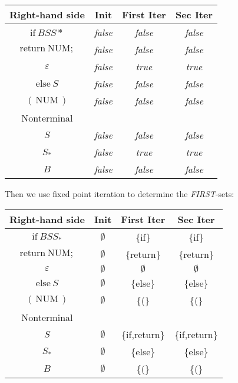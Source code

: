 \documentclass[11pt,a4paper]{article}
\begin{document}
\begin{center}
\begin{tabular}{c||c|c|c}
Right-hand side & Init & First Iter & Sec Iter\tabularnewline
\hline 
\hline 
$\mathrm{if\:}BSS*$ & \emph{false} & \emph{false} & \emph{false}\tabularnewline
\hline 
$\mathrm{return\:NUM;}$ & \emph{false} & \emph{false} & \emph{false}\tabularnewline
\hline 
$\varepsilon$ & \emph{false} & \emph{true} & \emph{true}\tabularnewline
\hline 
$\mathrm{else}\:S$ & \emph{false} & \emph{false} & \emph{false}\tabularnewline
\hline 
$\mathrm{(\,NUM\,)}$ & \emph{false} & \emph{false} & \emph{false}\tabularnewline
\hline 
Nonterminal & \multicolumn{1}{c}{} & \multicolumn{1}{c}{} & \tabularnewline
\hline 
$S$ & \emph{false} & \emph{false} & \emph{false}\tabularnewline
\hline 
$S_*$ & \emph{false} & \emph{true} & \emph{true}\tabularnewline
\hline 
$B$ & \emph{false} & \emph{false} & \emph{false}\tabularnewline
\end{tabular}
\end{center}
Then we use fixed point iteration to determine the \emph{FIRST}-sets:
\begin{center}
\begin{tabular}{c||c|c|c}
Right-hand side & Init & First Iter & Sec Iter\tabularnewline
\hline 
\hline 
$\mathrm{if\:}BSS_*$       & $\emptyset$ & \{if\}        & \{if\}        \tabularnewline
\hline                                                                
$\mathrm{return\:NUM;}$ & $\emptyset$ & \{return\}    & \{return\}    \tabularnewline
\hline                                                                
$\varepsilon$           & $\emptyset$ & $\emptyset$   & $\emptyset$   \tabularnewline
\hline                                                                
$\mathrm{else}\:S$      & $\emptyset$ & \{else\}      & \{else\}      \tabularnewline
\hline                                                                
$\mathrm{(\,NUM\,)}$    & $\emptyset$ & \{(\}         & \{(\}         \tabularnewline
\hline 
Nonterminal & \multicolumn{1}{c}{} & \multicolumn{1}{c}{} & \tabularnewline
\hline 
$S$                     & $\emptyset$ & \{if,return\} & \{if,return\} \tabularnewline
\hline                                                                  
$S_*$                   & $\emptyset$ & \{else\}      & \{else\}      \tabularnewline
\hline                                                                 
$B$                     & $\emptyset$ & \{(\}         & \{(\}         \tabularnewline
\end{tabular}               
\end{center}                
\end{document}
